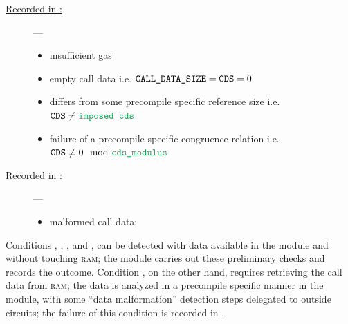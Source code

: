 \begin{description}
	\item[\underline{Recorded in \scenPrcFailureKnownToHub{}:}] ---
		\begin{itemize}
			\item
				\locBlsPrecompileFailureReasonGas{}
				insufficient gas
			\item
				\locBlsPrecompileFailureReasonEmpty{}
				empty call data i.e. $\texttt{CALL\_DATA\_SIZE} =\texttt{CDS} = 0$
			\item
				\locBlsPrecompileFailureReasonSize{}
				\cds{} differs from some precompile specific reference size i.e. $\cds \neq \locImposedCallDataSizeForBlsPrecompiles$
			\item
				\locBlsPrecompileFailureReasonMod{}
				failure of a precompile specific congruence relation i.e. $\cds \not \equiv 0 \mod \locCallDataSizeModulusForBlsPrecompiles$
		\end{itemize}
	\item[\underline{Recorded in \scenPrcFailureKnownToRam{}:}] ---
		\begin{itemize}
			\item
				\locBlsPrecompileFailureReasonData{}
				malformed call data;
		\end{itemize}
\end{description}
Conditions
\locBlsPrecompileFailureReasonGas,
\locBlsPrecompileFailureReasonEmpty,
\locBlsPrecompileFailureReasonSize, and
\locBlsPrecompileFailureReasonMod,
can be detected with data available in the \hubMod{} module and without touching \textsc{ram};
the \oobMod{} module carries out these preliminary checks and \scenPrcFailureKnownToHub{} records the outcome.
Condition
\locBlsPrecompileFailureReasonData,
on the other hand,
requires retrieving the call data from \textsc{ram};
the data is analyzed in a precompile specific manner in the \blsDataMod{} module,
with some ``data malformation'' detection steps delegated to outside circuits;
the failure of this condition is recorded in \scenPrcFailureKnownToRam{}.


